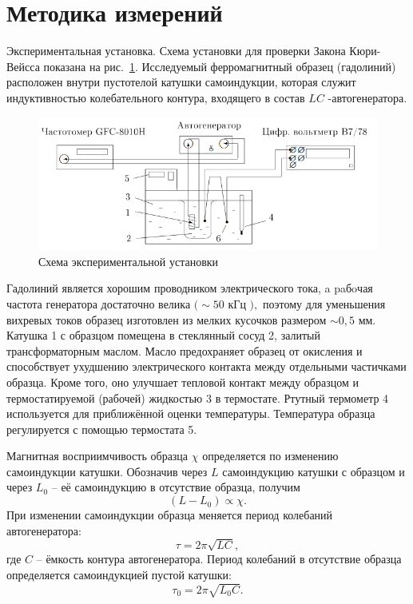 \documentclass[a4paper, 12pt]{article}
\begin{document}
\section{Методика измерений}

Экспериментальная установка. Схема установки для проверки Закона Кюри-Вейсса показана на рис.~\ref{ris1}. Исследуемый ферромагнитный образец (гадолиний) расположен внутри пустотелой катушки самоиндукции, которая служит индуктивностью колебательного контура, входящего в состав $L C$ -автогенератора.

\begin{figure}[h!]
\begin{center}
    \includegraphics[scale=0.8]{1.png}
\end{center}
\caption{Схема экспериментальной установки}
\label{ris1}
\end{figure}

Гадолиний является хорошим проводником электрического тока, a paбoчая частота генератора достаточно велика $(\sim 50$ кГц $),$ поэтому для уменьшения вихревых токов образец изготовлен из мелких кусочков размером $\sim 0,5$ мм. Катушка 1 с образцом помещена в стеклянный сосуд 2, залитый трансформаторным маслом. Масло предохраняет образец от окисления и способствует ухудшению электрического контакта между отдельными частичками образца. Кроме того, оно улучшает тепловой контакт между образцом и термостатируемой (рабочей) жидкостью 3 в термостате. Ртутный термометр 4 используется для приближённой оценки температуры. Температура образца регулируется с помощью термостата 5.

Магнитная восприимчивость образца $\chi$ определяется по изменению самоиндукции катушки. Обозначив через $L$ самоиндукцию катушки с образцом и через $L_0$ -- её самоиндукцию в отсутствие образца, получим
\begin{equation*}
	(L-L_0)\propto \chi.
\end{equation*}
При изменении самоиндукции образца меняется период колебаний автогенератора:
\begin{equation*}
	\tau = 2\pi \sqrt{LC},
\end{equation*}
где $C$ -- ёмкость контура автогенератора. Период колебаний в отсутствие образца определяется самоиндукцией пустой катушки:
\begin{equation*}
	\tau_0 = 2\pi \sqrt{L_0C}.
\end{equation*}
\end{document}
